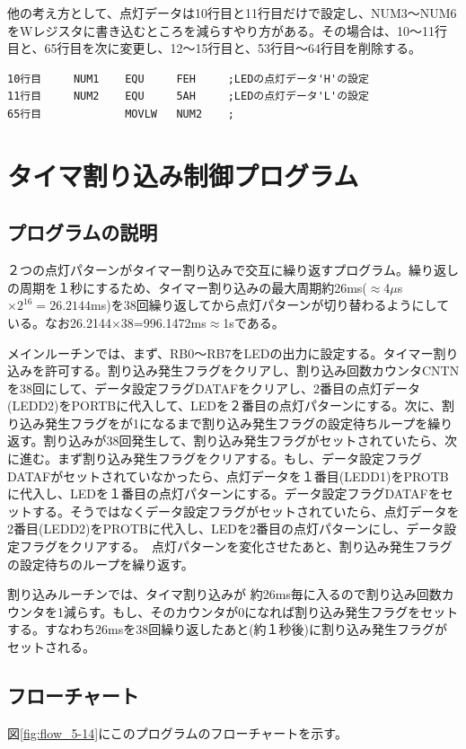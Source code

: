 \documentclass[a4paper,12pt]{ujarticle}
\begin{document}
      他の考え方として、点灯データは10行目と11行目だけで設定し、NUM3〜NUM6をWレジスタに書き込むところを減らすやり方がある。その場合は、10〜11行目と、65行目を次に変更し、12〜15行目と、53行目〜64行目を削除する。
      \begin{lstlisting}[basicstyle=\ttfamily\footnotesize, frame=single]
10行目     NUM1    EQU     FEH     ;LEDの点灯データ'H'の設定
11行目     NUM2    EQU     5AH     ;LEDの点灯データ'L'の設定
65行目             MOVLW   NUM2    ;
      \end{lstlisting}


 \clearpage
 \section{タイマ割り込み制御プログラム}
  \subsection{プログラムの説明}

２つの点灯パターンがタイマー割り込みで交互に繰り返すプログラム。繰り返しの周期を１秒にするため、タイマー割り込みの最大周期約26ms($\approx$4$\mu$s$\times 2^{16}=26.2144$ms)を38回繰り返してから点灯パターンが切り替わるようにしている。なお26.2144$\times$38=996.1472ms$\approx$1sである。

  メインルーチンでは、まず、RB0〜RB7をLEDの出力に設定する。タイマー割り込みを許可する。割り込み発生フラグをクリアし、割り込み回数カウンタCNTNを38回にして、データ設定フラグDATAFをクリアし、2番目の点灯データ(LEDD2)をPORTBに代入して、LEDを２番目の点灯パターンにする。次に、割り込み発生フラグをが1になるまで割り込み発生フラグの設定待ちループを繰り返す。割り込みが38回発生して、割り込み発生フラグがセットされていたら、次に進む。まず割り込み発生フラグをクリアする。もし、データ設定フラグDATAFがセットされていなかったら、点灯データを１番目(LEDD1)をPROTBに代入し、LEDを１番目の点灯パターンにする。データ設定フラグDATAFをセットする。そうではなくデータ設定フラグがセットされていたら、点灯データを2番目(LEDD2)をPROTBに代入し、LEDを2番目の点灯パターンにし、データ設定フラグをクリアする。　点灯パターンを変化させたあと、割り込み発生フラグの設定待ちのループを繰り返す。

  割り込みルーチンでは、タイマ割り込みが
約26ms毎に入るので割り込み回数カウンタを1減らす。もし、そのカウンタが0になれば割り込み発生フラグをセットする。すなわち26msを38回繰り返したあと(約１秒後)に割り込み発生フラグがセットされる。


  \subsection{フローチャート}
  図\ref{fig:flow_5-14}にこのプログラムのフローチャートを示す。
\end{document}
